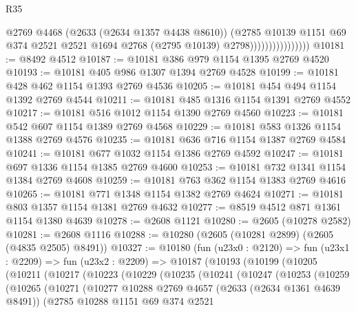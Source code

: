 \begin{lexlean}{R35}
\begin{coremodule}
                                  @2769
                                  @4468
                                  (@2633 (@2634 @1357 @4438 @8610))
                                  (@2785
                                    @10139
                                    @1151
                                    @69
                                    @374
                                    @2521
                                    @2521
                                    @1694
                                    @2768
                                    (@2795 @10139)
                                    @2798))))))))))))))))
@10181 := @8492 @4512
@10187 := @10181 @386 @979 @1154 @1395 @2769 @4520
@10193 := @10181 @405 @986 @1307 @1394 @2769 @4528
@10199 := @10181 @428 @462 @1154 @1393 @2769 @4536
@10205 := @10181 @454 @494 @1154 @1392 @2769 @4544
@10211 := @10181 @485 @1316 @1154 @1391 @2769 @4552
@10217 := @10181 @516 @1012 @1154 @1390 @2769 @4560
@10223 := @10181 @542 @607 @1154 @1389 @2769 @4568
@10229 := @10181 @583 @1326 @1154 @1388 @2769 @4576
@10235 := @10181 @636 @716 @1154 @1387 @2769 @4584
@10241 := @10181 @677 @1032 @1154 @1386 @2769 @4592
@10247 := @10181 @697 @1336 @1154 @1385 @2769 @4600
@10253 := @10181 @732 @1341 @1154 @1384 @2769 @4608
@10259 := @10181 @763 @362 @1154 @1383 @2769 @4616
@10265 := @10181 @771 @1348 @1154 @1382 @2769 @4624
@10271 := @10181 @803 @1357 @1154 @1381 @2769 @4632
@10277 := @8519 @4512 @871 @1361 @1154 @1380 @4639
@10278 := @2608 @1121
@10280 := @2605 (@10278 @2582)
@10281 := @2608 @1116
@10288 := @10280 (@2605 (@10281 @2899) (@2605 (@4835 @2505) @8491))
@10327 := @10180
    (fun (u23x0 : @2120) =>
    fun (u23x1 : @2209) =>
    fun (u23x2 : @2209) =>
    @10187
      (@10193
        (@10199
          (@10205
            (@10211
              (@10217
                (@10223
                  (@10229
                    (@10235
                      (@10241
                        (@10247
                          (@10253
                            (@10259
                              (@10265
                                (@10271
                                  (@10277
                                    @10288
                                    @2769
                                    @4657
                                    (@2633 (@2634 @1361 @4639 @8491))
                                    (@2785
                                      @10288
                                      @1151
                                      @69
                                      @374
                                      @2521

\end{coremodule}
\end{lexlean}
